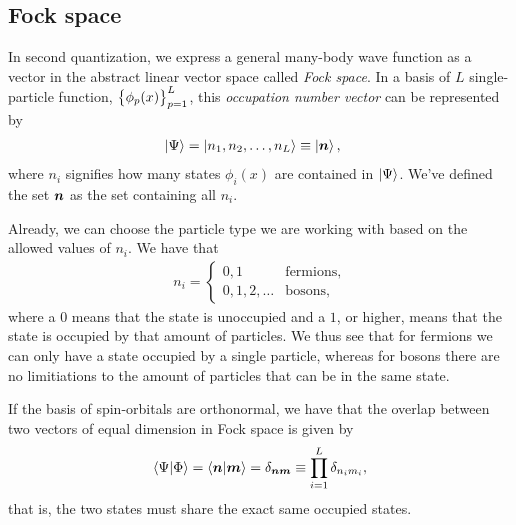         \subsection{Fock space}
            In second quantization, we express a general many-body wave function
            as a vector in the abstract linear vector space called \emph{Fock
            space}.
            In a basis of $L$ single-particle function, $\left\{ \phi_p(x) \right\}_{p =
            1}^{L}$, this \emph{occupation number vector} can be represented by
            \begin{align}
                \ket{\Psi}
                &= \ket{n_1, n_2, \dots, n_L}
                \equiv \ket{\boldsymbol{n}},
            \end{align}
            where $n_i$ signifies how many states $\phi_i(x)$ are contained in
            $\ket{\Psi}$.
            We've defined the set $\boldsymbol{n}$ as the set containing all $n_i$.

            Already, we can choose the particle type we are working with based
            on the allowed values of $n_i$.
            We have that
            \begin{align}
                n_i =
                \begin{cases}
                    0, 1 & \text{fermions}, \\
                    0, 1, 2, \dots & \text{bosons},
                \end{cases}
            \end{align}
            where a $0$ means that the state is unoccupied and a $1$, or higher,
            means that the state is occupied by that amount of particles.
            We thus see that for fermions we can only have a state occupied by a
            single particle, whereas for bosons there are no limitiations to the
            amount of particles that can be in the same state.

            If the basis of spin-orbitals are orthonormal, we have that the
            overlap between two vectors of equal dimension in Fock space is
            given by
            \begin{align}
                \braket{\Psi}{\Phi}
                = \braket{\boldsymbol{n}}{\boldsymbol{m}}
                = \delta_{\boldsymbol{n}\boldsymbol{m}}
                \equiv \prod_{i = 1}^{L} \delta_{n_i m_i},
            \end{align}
            that is, the two states must share the exact same occupied states.

